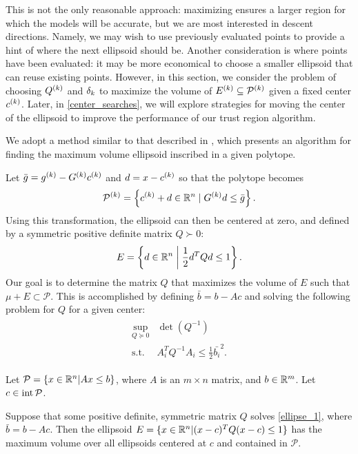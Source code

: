 This is not the only reasonable approach: maximizing ensures a larger region for which the models will be accurate, 
but we are most interested in descent directions.
Namely, we may wish to use previously evaluated points to provide a hint of where the next ellipsoid should be.
Another consideration is where points have been evaluated: it may be more economical to choose a smaller ellipsoid that can reuse existing points.
However, in this section,  we consider the problem of choosing ${Q^{(k)}}$ and $\delta_k$ to maximize the volume of ${E^{(k)}} \subseteq {{\mathcal{P}}^{(k)}}$ given a fixed center $c^{(k)}$.
Later, in \cref{center_searches}, we will explore strategies for moving the center of the ellipsoid to improve the performance of our trust region algorithm.

We adopt a method similar to that described in \cite{Khachiyan1993},
which presents an algorithm for finding the maximum volume ellipsoid inscribed in a given polytope.

Let $\bar g = {g^{(k)}} - G^{(k)} c^{(k)}$ and $d = x - c^{(k)}$ so that the polytope becomes
\begin{align*}
{{\mathcal{P}}^{(k)}} = \left\{ c^{(k)} + d \in \mathbb R^n \; | \;  G^{(k)} d \le \bar{g} \right\}.
\end{align*}
Using this transformation, the ellipsoid can then be centered at zero, and defined by a symmetric positive definite matrix $Q \succ 0$:
\begin{align*}
E = \left\{ d \in \mathbb R^n \; \bigg | \; \frac 1 2 d^T Q d \le 1 \right\}.
\end{align*}
Our goal is to determine the matrix $Q$ that maximizes the volume of $E$ such that $\mu + E \subset \mathcal{P}$.
This is accomplished by defining $\bar b = b - Ac$ and solving the following problem for $Q$ for a given center:
 \begin{align}
\begin{array}{cc}
 \sup_{Q \succeq 0} & \det(Q^{-1})  \\
 \textrm{s.t.} & A_i^T Q^{-1} A_i \le \frac 1 2 \bar{b_i}^2.
\end{array}
 \label{ellipse_1}
\end{align}


\begin{theorem} 

Let $\mathcal{P} = \{x \in \mathbb R^n | Ax \le b\}$, 
where $A$ is an $m \times n$ matrix, 
and $b \in \mathbb R^m$.  Let $c \in \operatorname{int}{\mathcal{P}}$.

Suppose that some positive definite, symmetric matrix $Q$ solves \cref{ellipse_1}, where $\bar{b} = b - Ac$.
Then the ellipsoid $E = \{ x \in \mathbb R^n | (x-c)^T Q(x-c) \le 1\}$ has the maximum volume over all ellipsoids centered at $c$ and contained in $\mathcal{P}$.
\end{theorem}

